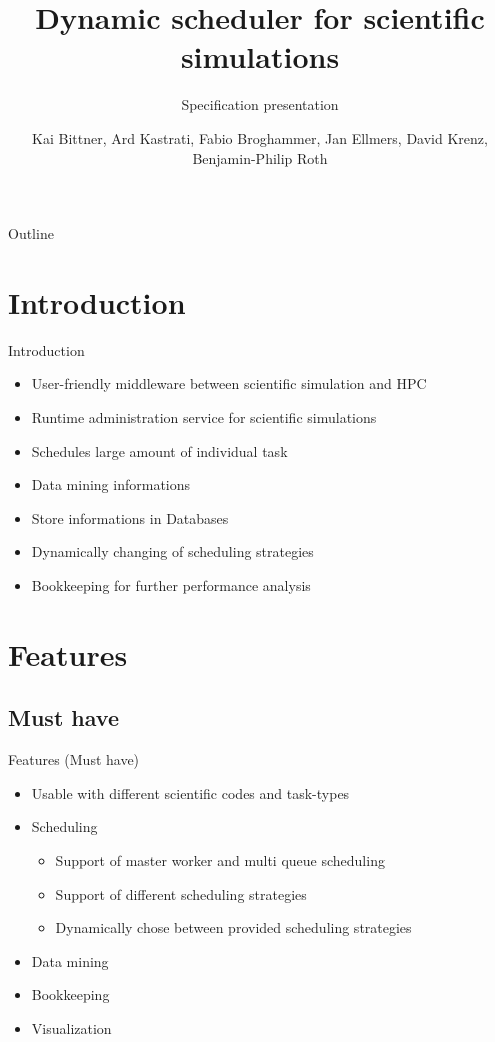 \documentclass[18pt]{beamer}
\title[Specification presentation]{Dynamic scheduler for scientific simulations}
\subtitle{Specification presentation}
\author{Kai Bittner, Ard Kastrati, Fabio Broghammer, Jan Ellmers, David Krenz, Benjamin-Philip Roth}
\institute{Steinbuch Centre for Computing (SCC)}
\begin{document}

\begin{frame}
\titlepage
\end{frame}

\begin{frame}{Outline}
\tableofcontents
\end{frame}

\section{Introduction}
	\begin{frame}{Introduction}
		\begin{itemize}
			\pause
			\item User-friendly middleware between scientific simulation and HPC
			\pause
			\item Runtime administration service for scientific simulations
			\pause
			\item Schedules large amount of individual task
			\pause
			\item Data mining informations
			\pause
			\item Store informations in Databases
			\pause
			\item Dynamically changing of scheduling strategies
			\pause
			\item Bookkeeping for further performance analysis
		\end{itemize}
	\end{frame}
	
\section{Features}
	\subsection{Must have}
	\begin{frame}{Features (Must have)}
		\begin{itemize}
			\pause
			\item Usable with different scientific codes and task-types
			\pause
			\item Scheduling	
				\begin{itemize}
					\item Support of master worker and multi queue scheduling
					\item Support of different scheduling strategies
					\item Dynamically chose between provided scheduling strategies
				\end{itemize}
				
			\pause
			\item Data mining
			\pause
			\item Bookkeeping
			\pause
			\item Visualization
		\end{itemize}
	\end{frame}
	
\end{document}
